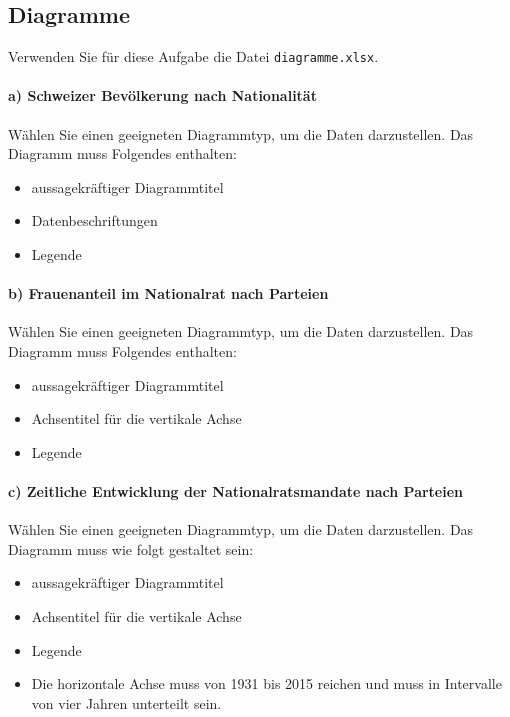 \subsection{Diagramme}
\begin{myexercise}[Diagramme]
    Verwenden Sie für diese Aufgabe die Datei \texttt{diagramme.xlsx}.

    \paragraph*{a) Schweizer Bevölkerung nach Nationalität}
    Wählen Sie einen geeigneten Diagrammtyp, um die Daten darzustellen. Das Diagramm muss Folgendes enthalten:
    \begin{itemize}
        \item aussagekräftiger Diagrammtitel
        \item Datenbeschriftungen
        \item Legende
    \end{itemize}

    \paragraph*{b) Frauenanteil im Nationalrat nach Parteien}
    Wählen Sie einen geeigneten Diagrammtyp, um die Daten darzustellen. Das Diagramm muss Folgendes enthalten:
    \begin{itemize}
        \item aussagekräftiger Diagrammtitel
        \item Achsentitel für die vertikale Achse
        \item Legende
    \end{itemize}

    \paragraph*{c) Zeitliche Entwicklung der Nationalratsmandate nach Parteien}
    Wählen Sie einen geeigneten Diagrammtyp, um die Daten darzustellen. Das Diagramm muss wie folgt gestaltet sein:
    \begin{itemize}
        \item aussagekräftiger Diagrammtitel
        \item Achsentitel für die vertikale Achse
        \item Legende
        \item Die horizontale Achse muss von 1931 bis 2015 reichen und muss in Intervalle von vier Jahren unterteilt sein.
    \end{itemize}


\end{myexercise}
